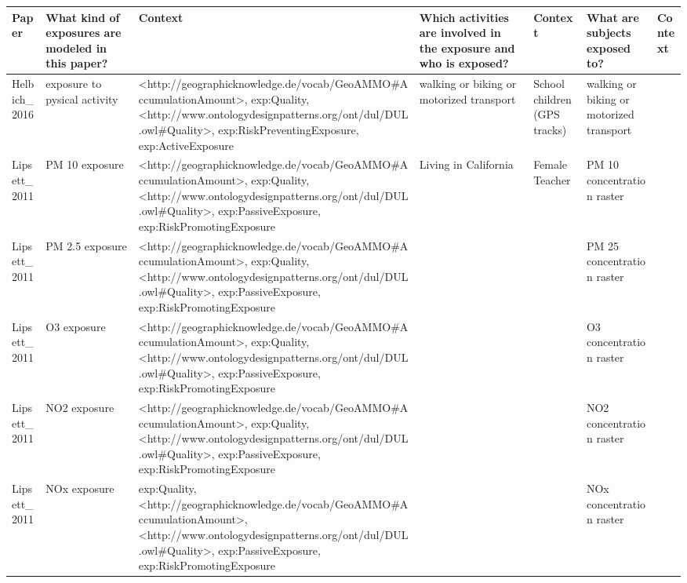 \begin{tabular}{p{1cm}p{1cm}p{1cm}p{1cm}p{1cm}p{1cm}p{1cm}}
\toprule
          Paper & What kind of exposures are modeled in this paper? &                                                                                                                                                                                                                        Context & Which activities are involved in the exposure and who is exposed? &                                                        Context &                     What are subjects exposed to? & Context \\
\midrule
Helbich\_2016 & exposure to pysical activity & <http://geographicknowledge.de/vocab/GeoAMMO\#AccumulationAmount>, exp:Quality, <http://www.ontologydesignpatterns.org/ont/dul/DUL.owl\#Quality>, exp:RiskPreventingExposure, exp:ActiveExposure & walking or biking or motorized transport & School children (GPS tracks) & walking or biking or motorized transport &  \\
Lipsett\_2011 & PM 10 exposure & <http://geographicknowledge.de/vocab/GeoAMMO\#AccumulationAmount>, exp:Quality, <http://www.ontologydesignpatterns.org/ont/dul/DUL.owl\#Quality>, exp:PassiveExposure, exp:RiskPromotingExposure & Living in California & Female Teacher & PM 10 concentration raster &  \\
Lipsett\_2011 & PM 2.5 exposure & <http://geographicknowledge.de/vocab/GeoAMMO\#AccumulationAmount>, exp:Quality, <http://www.ontologydesignpatterns.org/ont/dul/DUL.owl\#Quality>, exp:PassiveExposure, exp:RiskPromotingExposure &  &  & PM 25 concentration raster &  \\
Lipsett\_2011 & O3 exposure & <http://geographicknowledge.de/vocab/GeoAMMO\#AccumulationAmount>, exp:Quality, <http://www.ontologydesignpatterns.org/ont/dul/DUL.owl\#Quality>, exp:PassiveExposure, exp:RiskPromotingExposure &  &  & O3 concentration raster &  \\
Lipsett\_2011 & NO2 exposure & <http://geographicknowledge.de/vocab/GeoAMMO\#AccumulationAmount>, exp:Quality, <http://www.ontologydesignpatterns.org/ont/dul/DUL.owl\#Quality>, exp:PassiveExposure, exp:RiskPromotingExposure &  &  & NO2 concentration raster &  \\
Lipsett\_2011 & NOx exposure & exp:Quality, <http://geographicknowledge.de/vocab/GeoAMMO\#AccumulationAmount>, <http://www.ontologydesignpatterns.org/ont/dul/DUL.owl\#Quality>, exp:PassiveExposure, exp:RiskPromotingExposure &  &  & NOx concentration raster &  \\

\end{tabular}
